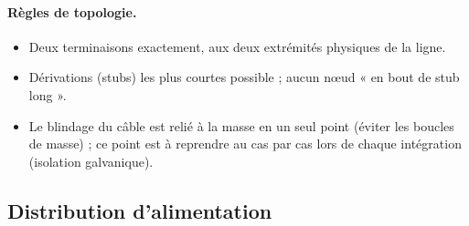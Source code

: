 \documentclass[11pt,a4paper]{article}
\begin{document}
\paragraph{Règles de topologie.}
\begin{itemize}[nosep]
  \item Deux terminaisons exactement, aux deux extrémités physiques de la ligne.
  \item Dérivations (stubs) les plus courtes possible ; aucun nœud « en bout de stub long ».
  \item Le blindage du câble est relié à la masse en un seul point (éviter les boucles de masse) ;
        ce point est à reprendre au cas par cas lors de chaque intégration (isolation galvanique).
\end{itemize}

\subsection{Distribution d'alimentation}
\label{sec:alim}
\end{document}
